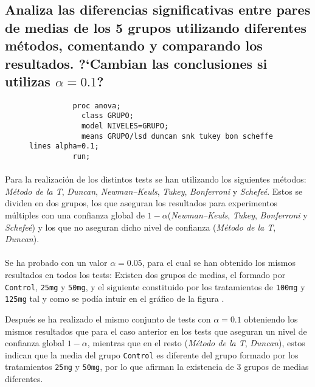 \documentclass{article}
\begin{document}
    \subsection{Analiza las diferencias significativas entre pares de medias de los 5 grupos utilizando diferentes métodos, comentando y comparando los resultados. ?`Cambian las conclusiones si utilizas $\alpha = 0.1$?}

      \begin{figure}[h]
        \centering
        \begin{verbatim}
          proc anova;
            class GRUPO;
            model NIVELES=GRUPO;
            means GRUPO/lsd duncan snk tukey bon scheffe lines alpha=0.1;
          run;
        \end{verbatim}
        \label{code:sas_5}
      \end{figure}

      \paragraph{}
      Para la realización de los distintos tests se han utilizando los siguientes métodos: \emph{Método de la T}, \emph{Duncan}, \emph{Newman–Keuls}, \emph{Tukey}, \emph{Bonferroni} y \emph{Schefeé}. Estos se dividen en dos grupos, los que aseguran los resultados para experimentos múltiples con una confianza global de $1-\alpha$(\emph{Newman–Keuls}, \emph{Tukey}, \emph{Bonferroni} y \emph{Schefeé}) y los que no aseguran dicho nivel de confianza (\emph{Método de la T}, \emph{Duncan}).

      \paragraph{}
      Se ha probado con un valor $\alpha = 0.05$, para el cual se han obtenido los mismos resultados en todos los tests: Existen dos grupos de medias, el formado por \texttt{Control}, \texttt{25mg} y \texttt{50mg}, y el siguiente constituido por los tratamientos de \texttt{100mg} y \texttt{125mg} tal y como se podía intuir en el gráfico de la figura \label{fig:figura_1}.

      Después se ha realizado el mismo conjunto de tests con $\alpha = 0.1$ obteniendo los mismos resultados que para el caso anterior en los tests que aseguran un nivel de confianza global $1-\alpha$, mientras que en el resto (\emph{Método de la T}, \emph{Duncan}), estos indican que la media del grupo \texttt{Control} es diferente del grupo formado por los tratamientos \texttt{25mg} y \texttt{50mg}, por lo que afirman la existencia de 3 grupos de medias diferentes.
\end{document}
